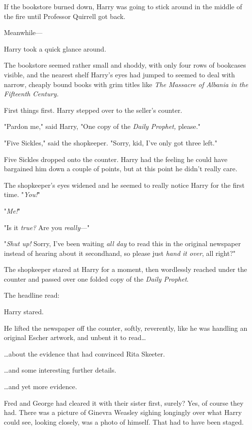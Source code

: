 If the bookstore burned down, Harry was going to stick around in the middle of
the fire until Professor Quirrell got back.

Meanwhile---

Harry took a quick glance around.

The bookstore seemed rather small and shoddy, with only four rows of bookcases
visible, and the nearest shelf Harry's eyes had jumped to seemed to deal with
narrow, cheaply bound books with grim titles like \emph{The Massacre of Albania
in the Fifteenth Century.}

First things first. Harry stepped over to the seller's counter.

"Pardon me," said Harry, "One copy of the \emph{Daily Prophet,} please."

"Five Sickles," said the shopkeeper. "Sorry, kid, I've only got three left."

Five Sickles dropped onto the counter. Harry had the feeling he could have
bargained him down a couple of points, but at this point he didn't really care.

The shopkeeper's eyes widened and he seemed to really notice Harry for the
first time. "\emph{You!}"

"\emph{Me!}"

"Is it \emph{true?} Are you \emph{really}---"

"\emph{Shut up!} Sorry, I've been waiting \emph{all day} to read this in the
original newspaper instead of hearing about it secondhand, so please just
\emph{hand it over}, all right?"

The shopkeeper stared at Harry for a moment, then wordlessly reached under the
counter and passed over one folded copy of the \emph{Daily Prophet}.

The headline read:


Harry stared.

He lifted the newspaper off the counter, softly, reverently, like he was
handling an original Escher artwork, and unbent it to read{\ldots}

{\ldots}about the evidence that had convinced Rita Skeeter.

{\ldots}and some interesting further details.

{\ldots}and yet more evidence.

Fred and George had cleared it with their sister first, surely? Yes, of course
they had. There was a picture of Ginevra Weasley sighing longingly over what
Harry could see, looking closely, was a photo of himself. That had to have been
staged.

